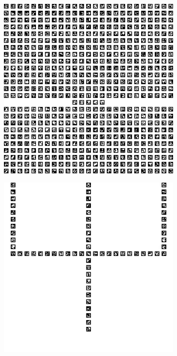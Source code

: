 \documentclass[../Head/report.tex]{subfiles}
\begin{document}
\begin{figure}[H]
    \centering
    \begin{subfigure}[t]{.20\textwidth}
        \centering
        \includegraphics[width=\textwidth]{../Figures/vision_navigation/grid_board_new_200_full.png}
        \caption{}
        \label{fig:gazebo_full_pattern_board}
    \end{subfigure}
     \hspace{0.2em}
    \begin{subfigure}[t]{.20\textwidth}
        \centering
        \includegraphics[width=\textwidth]{../Figures/vision_navigation/grid_board_new_200_big_onepattern.png}

\end{subfigure}
\end{figure}
\end{document}
